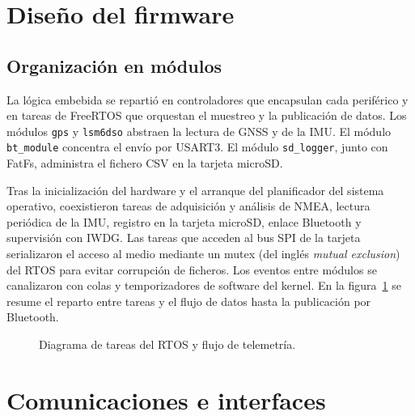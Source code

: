 \section{Diseño del firmware}
\label{sec:diseno-firmware}

\subsection{Organización en módulos}

La lógica embebida se repartió en controladores que encapsulan cada periférico y en tareas de FreeRTOS que orquestan el muestreo y la publicación de datos. Los módulos \texttt{gps} y \texttt{lsm6dso} abstraen la lectura de GNSS y de la IMU. El módulo \texttt{bt\_module} concentra el envío por USART3. El módulo \texttt{sd\_logger}, junto con FatFs, administra el fichero CSV en la tarjeta microSD.

Tras la inicialización del hardware y el arranque del planificador del sistema operativo, coexistieron tareas de adquisición y análisis de NMEA, lectura periódica de la IMU, registro en la tarjeta microSD, enlace Bluetooth y supervisión con IWDG. Las tareas que acceden al bus SPI de la tarjeta serializaron el acceso al medio mediante un mutex (del inglés \textit{mutual exclusion}) del RTOS para evitar corrupción de ficheros. Los eventos entre módulos se canalizaron con colas y temporizadores de software del kernel. En la figura~\ref{fig:cap3-flujo-firmware} se resume el reparto entre tareas y el flujo de datos hasta la publicación por Bluetooth.

\begin{figure}[H]
	\centering
	\caption[Flujo del firmware]{Diagrama de tareas del RTOS y flujo de telemetría.}
	\label{fig:cap3-flujo-firmware}
\end{figure}

\section{Comunicaciones e interfaces}
\label{sec:comunicaciones-implementacion}

